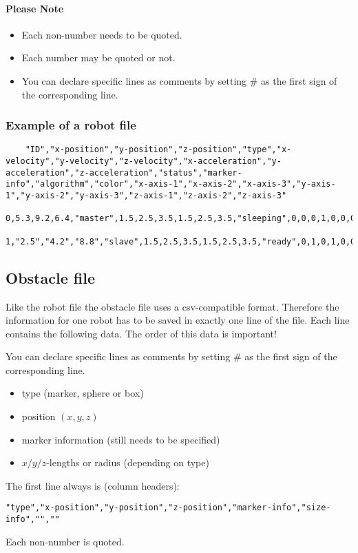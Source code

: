 \paragraph{Please Note}
\begin{itemize}
	\item Each non-number needs to be quoted.
	\item Each number may be quoted or not.
	\item You can declare specific lines as comments by setting \# as the first sign of the corresponding line.
\end{itemize}


\subsubsection{Example of a robot file}
\begin{lstlisting}
	"ID","x-position","y-position","z-position","type","x-velocity","y-velocity","z-velocity","x-acceleration","y-acceleration","z-acceleration","status","marker-info","algorithm","color","x-axis-1","x-axis-2","x-axis-3","y-axis-1","y-axis-2","y-axis-3","z-axis-1","z-axis-2","z-axis-3"
	0,5.3,9.2,6.4,"master",1.5,2.5,3.5,1.5,2.5,3.5,"sleeping",0,0,0,1,0,0,0,1,0,0,0,1
	1,"2.5","4.2","8.8","slave",1.5,2.5,3.5,1.5,2.5,3.5,"ready",0,1,0,1,0,0,0,1,0,0,0,1
\end{lstlisting}

\subsection{Obstacle file}
Like the robot file the obstacle file uses a csv-compatible format. 
Therefore the information for one robot has to be saved in exactly one line of the file.
Each line contains the following data. The order of this data is important!

You can declare specific lines as comments by setting \# as the first sign of
the corresponding line.
\begin{itemize}
	\item type (marker, sphere or box)
	\item position $(x,y,z)$
	\item marker information (still needs to be specified)
	\item $x/y/z$-lengths or radius (depending on type)
\end{itemize}

The first line always is (column headers):
\begin{lstlisting}
"type","x-position","y-position","z-position","marker-info","size-info","",""
\end{lstlisting}
Each non-number is quoted.


